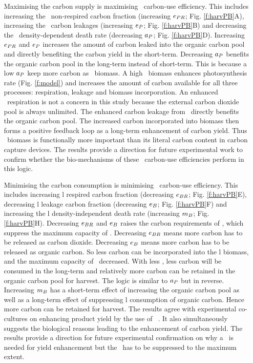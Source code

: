 \documentclass[../thesis.tex]{subfiles} %
\begin{document}
Maximising the carbon supply is maximising \phy\ carbon-use efficiency.  This includes increasing the \phy\ non-respired carbon fraction (increasing $e_{PR}$; Fig. \ref{f:harvPB}A), increasing the \phy\ carbon leakages (increasing $e_P$; Fig. \ref{f:harvPB}B) and decreasing the \phy\ density-dependent death rate (decreasing $a_P$; Fig. \ref{f:harvPB}D).  Increasing $e_{PR}$ and $e_P$ increases the amount of carbon leaked into the organic carbon pool and directly benefiting the carbon yield in the short-term.  Decreasing $a_P$ benefits the organic carbon pool in the long-term instead of short-term.  This is because a low $a_P$ keep more carbon as \phy\ biomass.  A high \phy\ biomass enhances photosynthesis rate (Fig. \ref{f:model}) and increases the amount of carbon available for all three processes: respiration, leakage and biomass incorporation.  An enhanced \phy\ respiration is not a concern in this study because the external carbon dioxide pool is always unlimited.  The enhanced carbon leakage from \phy\ directly benefits the organic carbon pool.  The increased carbon incorporated into biomass then forms a positive feedback loop as a long-term enhancement of carbon yield.  Thus \phy\ biomass is functionally more important than its literal carbon content in carbon capture devices.  The results provide a direction for future experimental work to confirm whether the bio-mechanisms of these \phy\ carbon-use efficiencies perform in this logic.

Minimising the carbon consumption is minimising \bac\ carbon-use efficiency.  This includes increasing \bac l respired carbon fraction (decreasing $e_{BR}$; Fig. \ref{f:harvPB}E), decreasing \bac l leakage carbon fraction (decreasing $e_B$; Fig. \ref{f:harvPB}F) and increasing the \bac l density-independent death rate (increasing $m_B$; Fig. \ref{f:harvPB}H).  Decreasing $e_{BR}$ and $e_B$ raises the carbon requirements of \bac, which suppress the maximum capacity of \bac.  Decreasing $e_{BR}$ means more carbon has to be released as carbon dioxide.  Decreasing $e_B$ means more carbon has to be released as organic carbon.  So less carbon can be incorporated into the \bac l biomass, and the maximum capacity of \bac\ decreased.  With less \bac, less carbon will be consumed in the long-term and relatively more carbon can be retained in the organic carbon pool for harvest.  The logic is similar to $a_P$ but in reverse.  Increasing $m_B$ has a short-term effect of increasing the organic carbon pool as well as a long-term effect of suppressing \bac l consumption of organic carbon.  Hence more carbon can be retained for harvest.  The results agree with experimental co-cultures on enhancing product yield by the use of \bac\ \autocite{fuentes2016impact,santos2014microalgal}.  It also simultaneously suggests the biological reasons leading to the enhancement of carbon yield.  The results provide a direction for future experimental confirmation on why a \bacm\ is needed for yield enhancement but the \bacm\ has to be suppressed to the maximum extent.
\end{document}
